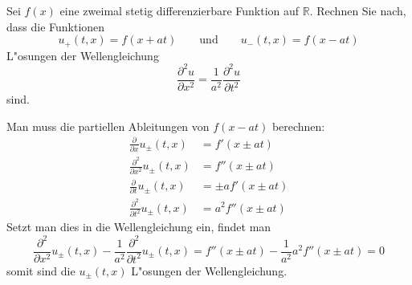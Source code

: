 Sei $f(x)$ eine zweimal stetig differenzierbare Funktion auf $\mathbb R$.
Rechnen Sie nach, dass die Funktionen
\[
u_+(t,x)=f(x+at)
\qquad
\text{und}
\qquad
u_-(t,x)=f(x-at)
\]
L"osungen der Wellengleichung
\[
\frac{\partial^2 u}{\partial x^2}=\frac1{a^2}\frac{\partial^2 u}{\partial t^2}
\]
sind.

\begin{loesung}
Man muss die partiellen Ableitungen von $f(x-at)$ berechnen:
\begin{align*}
\frac{\partial}{\partial x}u_{\pm}(t,x)
&=f'(x\pm at)
\\
\frac{\partial^2}{\partial x^2}u_{\pm}(t,x)
&=f''(x\pm at)
\\
\frac{\partial}{\partial t}u_{\pm}(t,x)
&=\pm af'(x\pm at)
\\
\frac{\partial^2}{\partial t^2}u_{\pm}(t,x)
&=a^2f''(x\pm at)
\end{align*}
Setzt man dies in die Wellengleichung ein, findet man
\[
\frac{\partial^2}{\partial x^2}u_{\pm}(t,x)
-\frac1{a^2}\frac{\partial^2}{\partial t^2}u_{\pm}(t,x)
=f''(x\pm at)
-\frac1{a^2} a^2f''(x\pm at)=0
\]
somit sind die $u_{\pm}(t,x)$ L"osungen der Wellengleichung.
\end{loesung}
